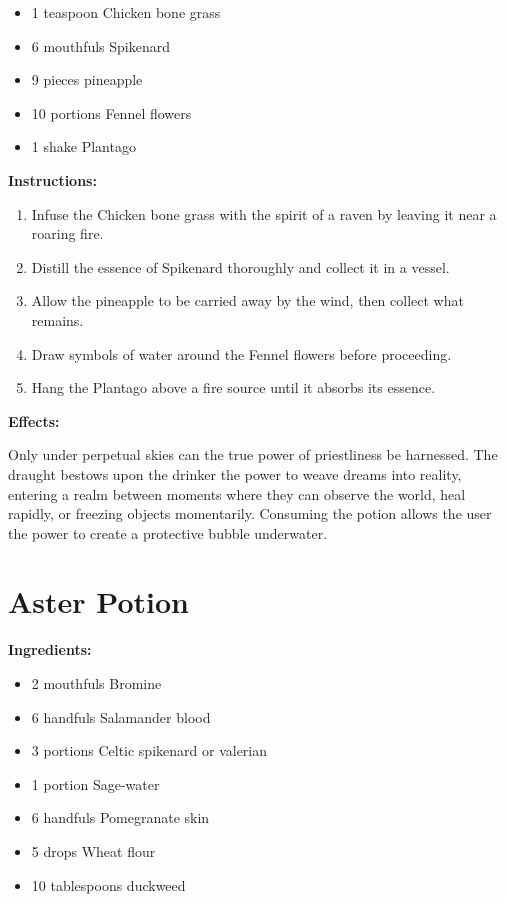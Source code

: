 \documentclass{article}
\begin{document}
\begin{itemize}
  \item 1 teaspoon Chicken bone grass
  \item 6 mouthfuls Spikenard
  \item 9 pieces pineapple
  \item 10 portions Fennel flowers
  \item 1 shake Plantago
\end{itemize}

\textbf{Instructions:}

\begin{enumerate}
  \item Infuse the Chicken bone grass with the spirit of a raven by leaving it near a roaring fire.
  \item Distill the essence of Spikenard thoroughly and collect it in a vessel.
  \item Allow the pineapple to be carried away by the wind, then collect what remains.
  \item Draw symbols of water around the Fennel flowers before proceeding.
  \item Hang the Plantago above a fire source until it absorbs its essence.
\end{enumerate}

\textbf{Effects:}

Only under perpetual skies can the true power of priestliness be harnessed. The draught bestows upon the drinker the power to weave dreams into reality, entering a realm between moments where they can observe the world, heal rapidly, or freezing objects momentarily. Consuming the potion allows the user the power to create a protective bubble underwater.

\newpage
\section*{Aster Potion}

\textbf{Ingredients:}

\begin{itemize}
  \item 2 mouthfuls Bromine
  \item 6 handfuls Salamander blood
  \item 3 portions Celtic spikenard or valerian
  \item 1 portion Sage-water
  \item 6 handfuls Pomegranate skin
  \item 5 drops Wheat flour
  \item 10 tablespoons duckweed
\end{itemize}
\end{document}
